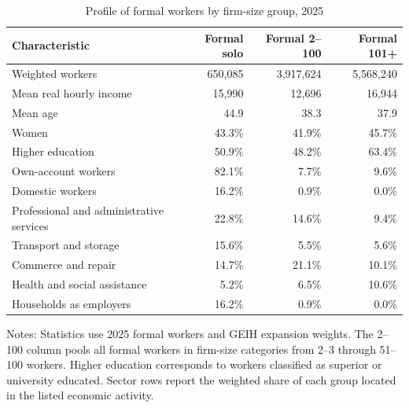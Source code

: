 \begin{table}[htbp]
  \centering
  \caption{Profile of formal workers by firm-size group, 2025}
  \label{tab:formal-worker-profile-2025}
  \small
  \begin{tabular}{lrrr}
    \toprule
    Characteristic & Formal solo & Formal 2--100 & Formal 101+ \\
    \midrule
    Weighted workers & 650,085 & 3,917,624 & 5,568,240 \\
    Mean real hourly income & 15,990 & 12,696 & 16,944 \\
    Mean age & 44.9 & 38.3 & 37.9 \\
    Women & 43.3\% & 41.9\% & 45.7\% \\
    Higher education & 50.9\% & 48.2\% & 63.4\% \\
    Own-account workers & 82.1\% & 7.7\% & 9.6\% \\
    Domestic workers & 16.2\% & 0.9\% & 0.0\% \\
    Professional and administrative services & 22.8\% & 14.6\% & 9.4\% \\
    Transport and storage & 15.6\% & 5.5\% & 5.6\% \\
    Commerce and repair & 14.7\% & 21.1\% & 10.1\% \\
    Health and social assistance & 5.2\% & 6.5\% & 10.6\% \\
    Households as employers & 16.2\% & 0.9\% & 0.0\% \\
    \bottomrule
  \end{tabular}
  \vspace{0.3em}
  \begin{minipage}{0.95\textwidth}
  \footnotesize
  Notes: Statistics use 2025 formal workers and GEIH expansion weights. The 2--100 column pools all formal workers in firm-size categories from 2--3 through 51--100 workers. Higher education corresponds to workers classified as superior or university educated. Sector rows report the weighted share of each group located in the listed economic activity.
  \end{minipage}
\end{table}
